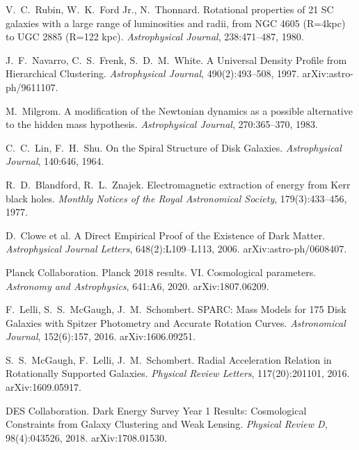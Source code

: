 \documentclass[12pt,a4paper]{article}
\theoremstyle{definition}
\theoremstyle{remark}
\begin{document}
\begin{thebibliography}{99}

V.~C.~Rubin, W.~K.~Ford Jr., N.~Thonnard.
\newblock Rotational properties of 21 SC galaxies with a large range of luminosities and radii, from NGC 4605 (R=4kpc) to UGC 2885 (R=122 kpc).
\newblock \emph{Astrophysical Journal}, 238:471--487, 1980.

J.~F.~Navarro, C.~S.~Frenk, S.~D.~M.~White.
\newblock A Universal Density Profile from Hierarchical Clustering.
\newblock \emph{Astrophysical Journal}, 490(2):493--508, 1997. arXiv:astro-ph/9611107.

M.~Milgrom.
\newblock A modification of the Newtonian dynamics as a possible alternative to the hidden mass hypothesis.
\newblock \emph{Astrophysical Journal}, 270:365--370, 1983.

C.~C.~Lin, F.~H.~Shu.
\newblock On the Spiral Structure of Disk Galaxies.
\newblock \emph{Astrophysical Journal}, 140:646, 1964.

R.~D.~Blandford, R.~L.~Znajek.
\newblock Electromagnetic extraction of energy from Kerr black holes.
\newblock \emph{Monthly Notices of the Royal Astronomical Society}, 179(3):433--456, 1977.

D.~Clowe et al.
\newblock A Direct Empirical Proof of the Existence of Dark Matter.
\newblock \emph{Astrophysical Journal Letters}, 648(2):L109--L113, 2006. arXiv:astro-ph/0608407.

Planck Collaboration.
\newblock Planck 2018 results. VI. Cosmological parameters.
\newblock \emph{Astronomy and Astrophysics}, 641:A6, 2020. arXiv:1807.06209.

F.~Lelli, S.~S.~McGaugh, J.~M.~Schombert.
\newblock SPARC: Mass Models for 175 Disk Galaxies with Spitzer Photometry and Accurate Rotation Curves.
\newblock \emph{Astronomical Journal}, 152(6):157, 2016. arXiv:1606.09251.

S.~S.~McGaugh, F.~Lelli, J.~M.~Schombert.
\newblock Radial Acceleration Relation in Rotationally Supported Galaxies.
\newblock \emph{Physical Review Letters}, 117(20):201101, 2016. arXiv:1609.05917.

DES Collaboration.
\newblock Dark Energy Survey Year 1 Results: Cosmological Constraints from Galaxy Clustering and Weak Lensing.
\newblock \emph{Physical Review D}, 98(4):043526, 2018. arXiv:1708.01530.


\end{thebibliography}
\end{document}
